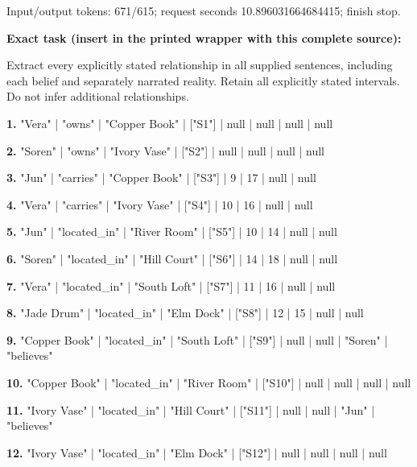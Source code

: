 Input/output tokens: 671/615; request seconds 10.896031664684415; finish stop.

\noindent\textbf{Exact task (insert in the printed wrapper with this complete source):}\par Extract every explicitly stated relationship in all supplied sentences, including each belief and separately narrated reality. Retain all explicitly stated intervals. Do not infer additional relationships.

\noindent\textbf{1.} "Vera" | "owns" | "Copper Book" | ["S1"] | null | null | null | null\par\smallskip

\noindent\textbf{2.} "Soren" | "owns" | "Ivory Vase" | ["S2"] | null | null | null | null\par\smallskip

\noindent\textbf{3.} "Jun" | "carries" | "Copper Book" | ["S3"] | 9 | 17 | null | null\par\smallskip

\noindent\textbf{4.} "Vera" | "carries" | "Ivory Vase" | ["S4"] | 10 | 16 | null | null\par\smallskip

\noindent\textbf{5.} "Jun" | "located\_in" | "River Room" | ["S5"] | 10 | 14 | null | null\par\smallskip

\noindent\textbf{6.} "Soren" | "located\_in" | "Hill Court" | ["S6"] | 14 | 18 | null | null\par\smallskip

\noindent\textbf{7.} "Vera" | "located\_in" | "South Loft" | ["S7"] | 11 | 16 | null | null\par\smallskip

\noindent\textbf{8.} "Jade Drum" | "located\_in" | "Elm Dock" | ["S8"] | 12 | 15 | null | null\par\smallskip

\noindent\textbf{9.} "Copper Book" | "located\_in" | "South Loft" | ["S9"] | null | null | "Soren" | "believes"\par\smallskip

\noindent\textbf{10.} "Copper Book" | "located\_in" | "River Room" | ["S10"] | null | null | null | null\par\smallskip

\noindent\textbf{11.} "Ivory Vase" | "located\_in" | "Hill Court" | ["S11"] | null | null | "Jun" | "believes"\par\smallskip

\noindent\textbf{12.} "Ivory Vase" | "located\_in" | "Elm Dock" | ["S12"] | null | null | null | null\par\smallskip

